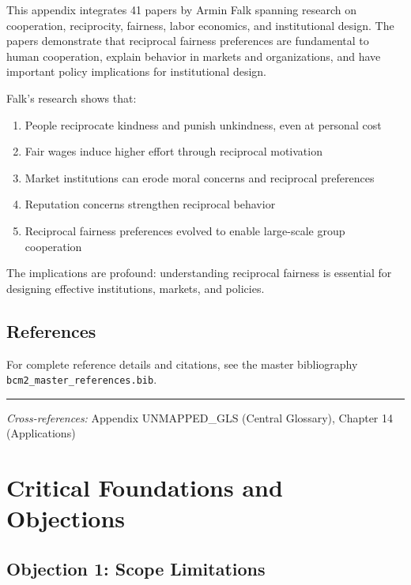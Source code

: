 This appendix integrates 41 papers by Armin Falk spanning research on
cooperation, reciprocity, fairness, labor economics, and institutional design. The papers demonstrate
that reciprocal fairness preferences are fundamental to human cooperation, explain behavior in
markets and organizations, and have important policy implications for institutional design.

Falk's research shows that:
\begin{enumerate}
  \item People reciprocate kindness and punish unkindness, even at personal cost
  \item Fair wages induce higher effort through reciprocal motivation
  \item Market institutions can erode moral concerns and reciprocal preferences
  \item Reputation concerns strengthen reciprocal behavior
  \item Reciprocal fairness preferences evolved to enable large-scale group cooperation
\end{enumerate}

The implications are profound: understanding reciprocal fairness is essential for designing
effective institutions, markets, and policies.

\subsection{References}

For complete reference details and citations, see the master bibliography
\texttt{bcm2\_master\_references.bib}.

\vspace{1em}
\hrule
\vspace{0.5em}

\noindent\textit{Cross-references:}
Appendix UNMAPPED_GLS (Central Glossary), Chapter 14 (Applications)



\section{Critical Foundations and Objections}
\label{sec:fal-foundations}

\subsection{Objection 1: Scope Limitations}

